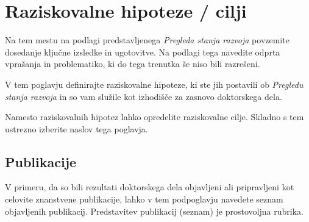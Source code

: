 \chapter{Raziskovalne hipoteze / cilji}\label{cha:hipoteze}
Na tem mestu na podlagi predstavljenega \emph{Pregleda stanja razvoja} povzemite dosedanje ključne izsledke in ugotovitve. Na podlagi tega navedite odprta vprašanja in problematiko, ki do tega trenutka še niso bili razrešeni.

V tem poglavju definirajte raziskovalne hipoteze, ki ste jih postavili ob \emph{Pregledu stanja razvoja} in so vam služile kot izhodišče za zasnovo doktorskega dela.

Namesto raziskovalnih hipotez lahko opredelite raziskovalne cilje. Skladno s tem ustrezno izberite naslov tega poglavja.

\section{Publikacije}\label{sec:publikacije}
V primeru, da so bili rezultati doktorskega dela objavljeni ali pripravljeni kot celovite znanstvene publikacije, lahko v tem podpoglavju navedete seznam objavljenih publikacij. Predstavitev publikacij (seznam) je prostovoljna rubrika.
